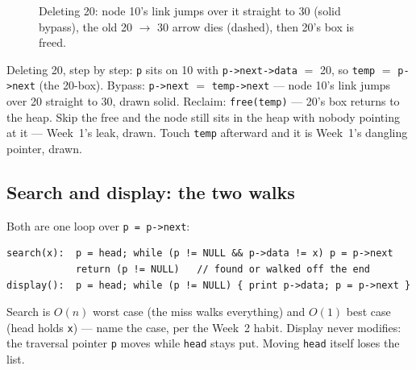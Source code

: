 \documentclass[11pt]{article}
\begin{document}
\begin{figure}[h]
  \centering
  \caption{Deleting 20: node 10's link jumps over it straight to 30 (solid bypass), the old 20 $\to$ 30 arrow dies (dashed), then 20's box is freed.}
  \label{fig:delete-middle}
\end{figure}

Deleting 20, step by step: \texttt{p} sits on 10 with \texttt{p->next->data} $=$ 20, so \texttt{temp} $=$ \texttt{p->next} (the 20-box). Bypass: \texttt{p->next} $=$ \texttt{temp->next} --- node 10's link jumps over 20 straight to 30, drawn solid. Reclaim: \texttt{free(temp)} --- 20's box returns to the heap. Skip the free and the node still sits in the heap with nobody pointing at it --- Week~1's leak, drawn. Touch \texttt{temp} afterward and it is Week~1's dangling pointer, drawn.

\subsection{Search and display: the two walks}

Both are one loop over \texttt{p = p->next}:
{\footnotesize
\begin{verbatim}
search(x):  p = head; while (p != NULL && p->data != x) p = p->next
            return (p != NULL)   // found or walked off the end
display():  p = head; while (p != NULL) { print p->data; p = p->next }
\end{verbatim}
}
Search is $O(n)$ worst case (the miss walks everything) and $O(1)$ best case (head holds \texttt{x}) --- name the case, per the Week~2 habit. Display never modifies: the traversal pointer \texttt{p} moves while \texttt{head} stays put. Moving \texttt{head} itself loses the list.
\end{document}

